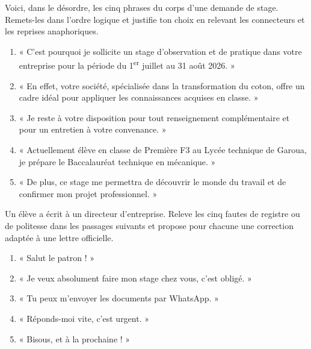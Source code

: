 \documentclass[11pt]{article}
\begin{document}
\begin{exercice}
Voici, dans le désordre, les cinq phrases du corps d'une demande de stage. Remets-les dans l'ordre logique et justifie ton choix en relevant les connecteurs et les reprises anaphoriques.
\begin{enumerate}
\item « C'est pourquoi je sollicite un stage d'observation et de pratique dans votre entreprise pour la période du 1\textsuperscript{er} juillet au 31 août 2026. »
\item « En effet, votre société, spécialisée dans la transformation du coton, offre un cadre idéal pour appliquer les connaissances acquises en classe. »
\item « Je reste à votre disposition pour tout renseignement complémentaire et pour un entretien à votre convenance. »
\item « Actuellement élève en classe de Première F3 au Lycée technique de Garoua, je prépare le Baccalauréat technique en mécanique. »
\item « De plus, ce stage me permettra de découvrir le monde du travail et de confirmer mon projet professionnel. »
\end{enumerate}
\end{exercice}

\begin{exercice}
Un élève a écrit à un directeur d'entreprise. Releve les cinq fautes de registre ou de politesse dans les passages suivants et propose pour chacune une correction adaptée à une lettre officielle.
\begin{enumerate}
\item « Salut le patron ! »
\item « Je veux absolument faire mon stage chez vous, c'est obligé. »
\item « Tu peux m'envoyer les documents par WhatsApp. »
\item « Réponds-moi vite, c'est urgent. »
\item « Bisous, et à la prochaine ! »
\end{enumerate}
\end{exercice}
\end{document}
